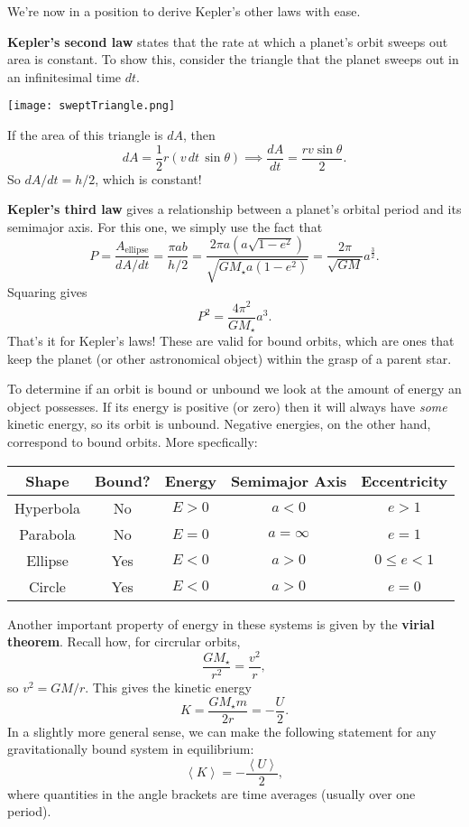 \documentclass[../a062main.tex]{subfiles}
\begin{document}
We're now in a position to derive Kepler's other laws with ease.

\textbf{Kepler's second law} states that the rate at which a planet's orbit sweeps out area is constant.
To show this, consider the triangle that the planet sweeps out in an infinitesimal time $dt$.
\begin{center}
    \texttt{[image: sweptTriangle.png]}
\end{center}
If the area of this triangle is $dA$, then
\[ dA = \frac{1}{2} r (v \,dt \,\sin \theta) \implies \frac{dA}{dt} = \frac{rv \sin \theta}{2}. \]
So $\boxed{dA/dt = h/2}$, which is constant!

\textbf{Kepler's third law} gives a relationship between a planet's orbital period and its semimajor axis.
For this one, we simply use the fact that
\[ P = \frac{A_\textrm{ellipse}}{dA/dt} = \frac{\pi ab}{h/2} = \frac{2 \pi a (a \sqrt{1 - e^2})}{\sqrt{GM_\star a (1-e^2)}} = \frac{2 \pi}{\sqrt{GM}} a^{\frac{3}{2}}. \]
Squaring gives
\[ \boxed{P^2 = \frac{4 \pi^2}{GM_\star} a^3}. \]
That's it for Kepler's laws!
These are valid for bound orbits, which are ones that keep the planet (or other astronomical object) within the grasp of a parent star.

To determine if an orbit is bound or unbound we look at the amount of energy an object possesses.
If its energy is positive (or zero) then it will always have \textit{some} kinetic energy, so its orbit is unbound.
Negative energies, on the other hand, correspond to bound orbits.
More specfically:

\begin{center}
\begin{tabular}{c|c|c|c|c}
    Shape & Bound? & Energy & Semimajor Axis & Eccentricity \\ \hline
    Hyperbola & No & $E > 0$ & $a < 0$ & $e > 1$ \\
    Parabola & No & $E = 0$ & $a = \infty$ & $e = 1$ \\
    Ellipse & Yes & $E < 0$ & $a > 0$ & $0 \leq e < 1$ \\
    Circle & Yes & $E < 0$ & $a > 0$ & $e = 0$
\end{tabular}
\end{center}

Another important property of energy in these systems is given by the \textbf{virial theorem}.
Recall how, for circrular orbits,
\[ \frac{GM_\star}{r^2} = \frac{v^2}{r}, \]
so $v^2 = GM/r$.
This gives the kinetic energy
\[ K = \frac{GM_\star m}{2r} = -\frac{U}{2}. \]
In a slightly more general sense, we can make the following statement for any gravitationally bound system in equilibrium:
\[ \boxed{\left< K \right> = -\frac{\left< U \right>}{2}}, \]
where quantities in the angle brackets are time averages (usually over one period).
\end{document}
